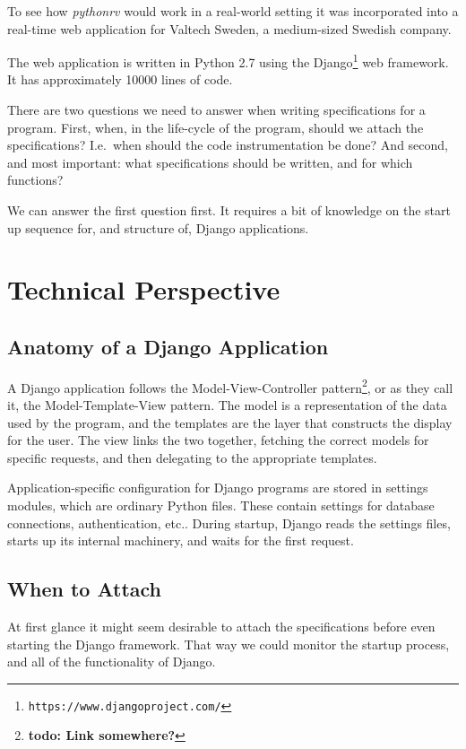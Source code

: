 \documentclass[a4paper,11pt]{kth-mag}
\newcommand{\todo}[1]{\textbf{todo: #1}}
\begin{document}
To see how \textit{pythonrv} would work in a real-world setting it was
incorporated into a real-time web application for Valtech Sweden, a
medium-sized Swedish company.

The web application is written in Python 2.7 using the
Django\footnote{\texttt{https://www.djangoproject.com/}} web framework. It has
approximately 10000 lines of code.

There are two questions we need to answer when writing specifications for a
program. First, when, in the life-cycle of the program, should we attach the
specifications? I.e.\ when should the code instrumentation be done? And second,
and most important: what specifications should be written, and for which
functions?

We can answer the first question first. It requires a bit of knowledge on the
start up sequence for, and structure of, Django applications.


\section{Technical Perspective}


\subsection{Anatomy of a Django Application}

A Django application follows the Model-View-Controller
pattern\footnote{\todo{Link somewhere?}}, or as they call it, the
Model-Template-View pattern. The model is a representation of the data used by
the program, and the templates are the layer that constructs the display for
the user. The view links the two together, fetching the correct models for
specific requests, and then delegating to the appropriate templates.

Application-specific configuration for Django programs are stored in settings
modules, which are ordinary Python files. These contain settings for database
connections, authentication, etc.. During startup, Django reads the settings
files, starts up its internal machinery, and waits for the first request.


\subsection{When to Attach}

At first glance it might seem desirable to attach the specifications before
even starting the Django framework. That way we could monitor the startup
process, and all of the functionality of Django.
\end{document}
